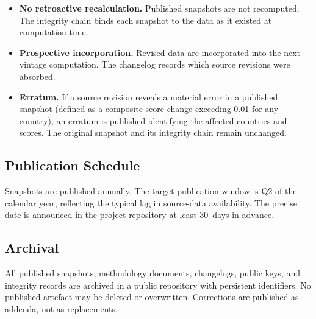 \begin{itemize}
  \item \textbf{No retroactive recalculation.}  Published snapshots are not
    recomputed.  The integrity chain binds each snapshot to the data as it
    existed at computation time.
  \item \textbf{Prospective incorporation.}  Revised data are incorporated
    into the next vintage computation.  The changelog records which source
    revisions were absorbed.
  \item \textbf{Erratum.}  If a source revision reveals a material error in
    a published snapshot (defined as a composite-score change exceeding
    \num{0.01} for any country), an erratum is published identifying the
    affected countries and scores.  The original snapshot and its integrity
    chain remain unchanged.
\end{itemize}

\subsection{Publication Schedule}\label{sec:gov:schedule}

Snapshots are published annually.  The target publication window is
Q2 of the calendar year, reflecting the typical lag in source-data
availability.  The precise date is announced in the project repository at
least 30~days in advance.

\subsection{Archival}\label{sec:gov:archival}

All published snapshots, methodology documents, changelogs, public keys, and
integrity records are archived in a public repository with persistent
identifiers.  No published artefact may be deleted or overwritten.
Corrections are published as addenda, not as replacements.